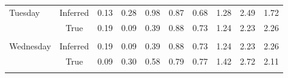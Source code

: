 \begin{table}[H]
\begin{tabular}{lccccccccc}
\multicolumn{1}{l|}{\multirow{2}{*}{Tuesday}}   & \multicolumn{1}{c|}{Inferred} & \multicolumn{1}{c|}{0.13}           & \multicolumn{1}{c|}{0.28}           & \multicolumn{1}{c|}{0.98}           & \multicolumn{1}{c|}{0.87}           & \multicolumn{1}{c|}{0.68}           & \multicolumn{1}{c|}{1.28}           & \multicolumn{1}{c|}{2.49}           & \multicolumn{1}{c|}{1.72}           \\ \cline{2-10} 
\multicolumn{1}{l|}{}                           & \multicolumn{1}{c|}{True}     & \multicolumn{1}{c|}{0.19}           & \multicolumn{1}{c|}{0.09}           & \multicolumn{1}{c|}{0.39}           & \multicolumn{1}{c|}{0.88}           & \multicolumn{1}{c|}{0.73}           & \multicolumn{1}{c|}{1.24}           & \multicolumn{1}{c|}{2.23}           & \multicolumn{1}{c|}{2.26}           \\ \cline{2-10} 
                                                &                               &                                     &                                     &                                     &                                     &                                     &                                     &                                     &                                     \\ \cline{2-10} 
\multicolumn{1}{l|}{\multirow{2}{*}{Wednesday}} & \multicolumn{1}{c|}{Inferred} & \multicolumn{1}{c|}{0.19}           & \multicolumn{1}{c|}{0.09}           & \multicolumn{1}{c|}{0.39}           & \multicolumn{1}{c|}{0.88}           & \multicolumn{1}{c|}{0.73}           & \multicolumn{1}{c|}{1.24}           & \multicolumn{1}{c|}{2.23}           & \multicolumn{1}{c|}{2.26}           \\ \cline{2-10} 
\multicolumn{1}{l|}{}                           & \multicolumn{1}{c|}{True}     & \multicolumn{1}{c|}{0.09}           & \multicolumn{1}{c|}{0.30}           & \multicolumn{1}{c|}{0.58}           & \multicolumn{1}{c|}{0.79}           & \multicolumn{1}{c|}{0.77}           & \multicolumn{1}{c|}{1.42}           & \multicolumn{1}{c|}{2.72}           & \multicolumn{1}{c|}{2.11}           \\ \cline{2-10} 
\multicolumn{1}{c}{}                            &                               &                                     &                                     &                                     &                                     &                                     &                                     &                                     &                                     \\ \cline{2-10} 

\end{tabular}
\end{table}
